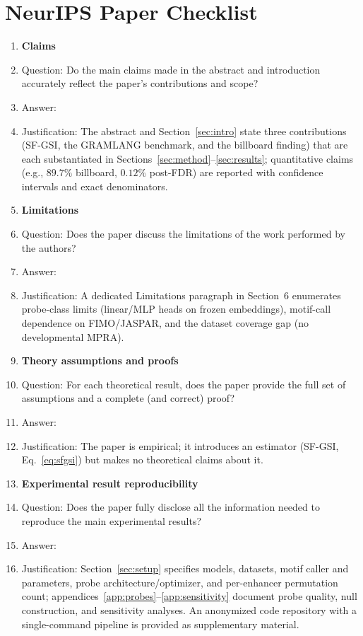 \section*{NeurIPS Paper Checklist}

\begin{enumerate}

\item {\bf Claims}
    \item[] Question: Do the main claims made in the abstract and introduction accurately reflect the paper's contributions and scope?
    \item[] Answer: \answerYes{}
    \item[] Justification: The abstract and Section~\ref{sec:intro} state three contributions (SF-GSI, the GRAMLANG benchmark, and the billboard finding) that are each substantiated in Sections~\ref{sec:method}--\ref{sec:results}; quantitative claims (e.g., $89.7\%$ billboard, $0.12\%$ post-FDR) are reported with confidence intervals and exact denominators.

\item {\bf Limitations}
    \item[] Question: Does the paper discuss the limitations of the work performed by the authors?
    \item[] Answer: \answerYes{}
    \item[] Justification: A dedicated Limitations paragraph in Section~6 enumerates probe-class limits (linear/MLP heads on frozen embeddings), motif-call dependence on FIMO/JASPAR, and the dataset coverage gap (no developmental MPRA).

\item {\bf Theory assumptions and proofs}
    \item[] Question: For each theoretical result, does the paper provide the full set of assumptions and a complete (and correct) proof?
    \item[] Answer: \answerNA{}
    \item[] Justification: The paper is empirical; it introduces an estimator (SF-GSI, Eq.~\ref{eq:sfgsi}) but makes no theoretical claims about it.

\item {\bf Experimental result reproducibility}
    \item[] Question: Does the paper fully disclose all the information needed to reproduce the main experimental results?
    \item[] Answer: \answerYes{}
    \item[] Justification: Section~\ref{sec:setup} specifies models, datasets, motif caller and parameters, probe architecture/optimizer, and per-enhancer permutation count; appendices~\ref{app:probes}--\ref{app:sensitivity} document probe quality, null construction, and sensitivity analyses. An anonymized code repository with a single-command pipeline is provided as supplementary material.


\end{enumerate}
